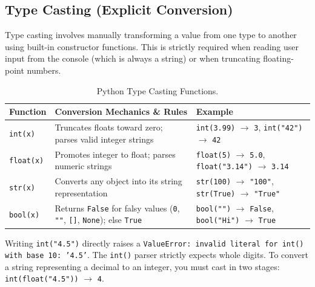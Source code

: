 \subsection{Type Casting (Explicit Conversion)}
Type casting involves manually transforming a value from one type to another using built-in constructor functions. This is strictly required when reading user input from the console (which is always a string) or when truncating floating-point numbers.

\begin{table}[htbp]
\centering
\small
\renewcommand{\arraystretch}{1.3}
\begin{tabularx}{\linewidth}{l>{\raggedright\arraybackslash}Xl}
\toprule
\textbf{Function} & \textbf{Conversion Mechanics \& Rules} & \textbf{Example} \\
\midrule
\texttt{int(x)} & Truncates floats toward zero; parses valid integer strings & \texttt{int(3.99)} $\to$ \texttt{3}, \texttt{int("42")} $\to$ \texttt{42} \\
\texttt{float(x)} & Promotes integer to float; parses numeric strings & \texttt{float(5)} $\to$ \texttt{5.0}, \texttt{float("3.14")} $\to$ \texttt{3.14} \\
\texttt{str(x)} & Converts any object into its string representation & \texttt{str(100)} $\to$ \texttt{"100"}, \texttt{str(True)} $\to$ \texttt{"True"} \\
\texttt{bool(x)} & Returns \texttt{False} for falsy values (\texttt{0}, \texttt{""}, \texttt{[]}, \texttt{None}); else \texttt{True} & \texttt{bool("")} $\to$ \texttt{False}, \texttt{bool("Hi")} $\to$ \texttt{True} \\
\bottomrule
\end{tabularx}
\caption{Python Type Casting Functions.}
\label{tab:type-casting}
\end{table}

\begin{commonmistake}
Writing \texttt{int("4.5")} directly raises a \texttt{ValueError: invalid literal for int() with base 10: '4.5'}. The \texttt{int()} parser strictly expects whole digits. To convert a string representing a decimal to an integer, you must cast in two stages: \texttt{int(float("4.5"))} $\to$ \texttt{4}.
\end{commonmistake}

